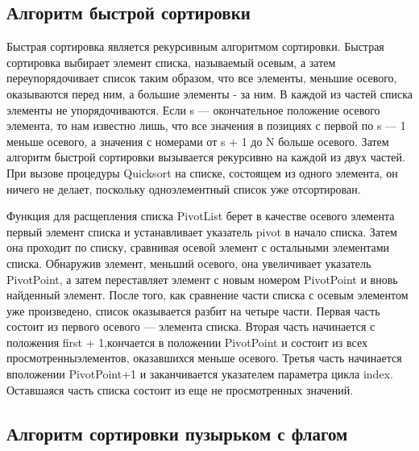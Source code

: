 \documentclass[a4paper,14pt]{report}
\begin{document}
\subsection*{Алгоритм быстрой сортировки}

Быстрая сортировка является рекурсивным алгоритмом сортировки.
Быстрая сортировка выбирает элемент списка, называемый осевым, а затем переупорядочивает список таким образом, что все элементы, меньшие осевого, оказываются перед ним, а большие элементы - за ним. В каждой из частей списка элементы не упорядочиваются.
Если s — окончательное положение осевого элемента, то нам известно лишь, что все значения в позициях с первой по s — 1 меньше осевого, а значения с номерами от s + 1 до N больше осевого. Затем алгоритм быстрой сортировки вызывается рекурсивно на каждой из двух частей.
При вызове процедуры Quicksort на списке, состоящем из одного элемента, он ничего не делает, поскольку одноэлементный список уже отсортирован.

Функция для расщепления списка PivotList берет в качестве осевого элемента первый элемент списка и устанавливает указатель pivot в начало списка. Затем она проходит по списку, сравнивая осевой элемент с остальными элементами списка. Обнаружив элемент, меньший осевого, она увеличивает указатель PivotPoint, а затем переставляет элемент с новым номером PivotPoint и вновь найденный элемент. После того, как сравнение части списка с осевым элементом уже произведено, список оказывается разбит на четыре части. Первая часть состоит из первого осевого — элемента списка. Вторая часть начинается с положения first + 1,кончается в положении PivotPoint и состоит из всех просмотренныэлементов, оказавшихся меньше осевого. Третья часть начинается вположении PivotPoint+1 и заканчивается указателем параметра цикла index. Оставшаяся часть списка состоит из еще не просмотренных значений.

\subsection*{Алгоритм сортировки пузырьком с флагом}
\end{document}
